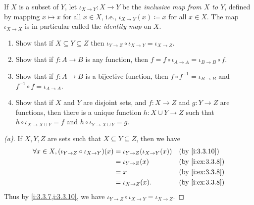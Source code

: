 \begin{ex}\label{i:ex:3.3.8}
  If \(X\) is a subset of \(Y\), let \(\iota_{X \to Y} : X \to Y\) be the \emph{inclusive map from \(X\) to \(Y\)}, defined by mapping \(x \mapsto x\) for all \(x \in X\), i.e., \(\iota_{X \to Y}(x) \coloneqq x\) for all \(x \in X\).
  The map \(\iota_{X \to X}\) is in particular called the \emph{identity map} on \(X\).
  \begin{enumerate}
    \item Show that if \(X \subseteq Y \subseteq Z\) then \(\iota_{Y \to Z} \circ \iota_{X \to Y} = \iota_{X \to Z}\).
    \item Show that if \(f : A \to B\) is any function, then \(f = f \circ \iota_{A \to A} = \iota_{B \to B} \circ f\).
    \item Show that if \(f : A \to B\) is a bijective function, then \(f \circ f^{-1} = \iota_{B \to B}\) and \(f^{-1} \circ f = \iota_{A \to A}\).
    \item Show that if \(X\) and \(Y\) are disjoint sets, and \(f : X \to Z\) and \(g : Y \to Z\) are functions, then there is a unique function \(h : X \cup Y \to Z\) such that \(h \circ \iota_{X \to X \cup Y} = f\) and \(h \circ \iota_{Y \to X \cup Y} = g\).
  \end{enumerate}
\end{ex}

\begin{proof}[(a)]
  If \(X, Y, Z\) are sets such that \(X \subseteq Y \subseteq Z\), then we have
  \begin{align*}
    \forall x \in X, (\iota_{Y \to Z} \circ \iota_{X \to Y})(x) & = \iota_{Y \to Z}(\iota_{X \to Y}(x)) &  & \by{i:3.3.10}   \\
                                                                & = \iota_{Y \to Z}(x)                  &  & \by{i:ex:3.3.8} \\
                                                                & = x                                   &  & \by{i:ex:3.3.8} \\
                                                                & = \iota_{X \to Z}(x).                 &  & \by{i:ex:3.3.8}
  \end{align*}
  Thus by \cref{i:3.3.7,i:3.3.10}, we have \(\iota_{Y \to Z} \circ \iota_{X \to Y} = \iota_{X \to Z}\).
\end{proof}


